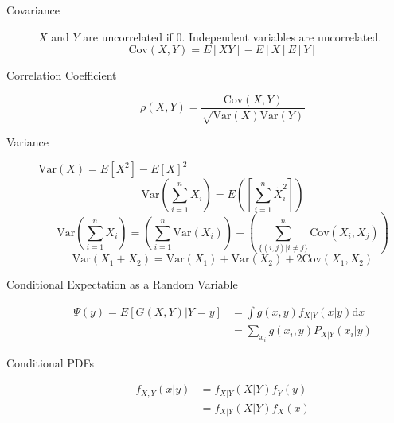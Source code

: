 \documentclass[8pt]{article}
\newcommand{\dd}[1]{\mathrm{d}{#1}}
\begin{document}

\begin{multicols}{2}
  \begin{description}
  \item[Covariance] $X$ and $Y$ are uncorrelated if 0. Independent
    variables are uncorrelated.
    $$\text{Cov}(X,Y)=E[XY]-E[X]E[Y]$$
  \item[Correlation Coefficient]
    $$\rho(X,Y)=\frac{\text{Cov}(X,Y)}{\sqrt{\text{Var}(X)\text{Var}(Y)}}$$
  \item[Variance] $\text{Var}(X) = E[X^2] - E[X]^2$
    $$\text{Var}\left(\sum_{i=1}^{n}X_i\right) =
    E\left(\left[\sum_{i=1}^{n}\tilde{X}_i^2\right]\right)$$
    $$\text{Var}\left(\sum_{i=1}^{n}X_i\right) =
    \left(\sum_{i=1}^{n}\text{Var}(X_i)\right) + \left(\sum_{\{(i,j) |
        i\not= j\}}^{n}\text{Cov}(X_i, X_j)\right)$$
    $$\text{Var}(X_1 + X_2) = \text{Var}(X_1) + \text{Var}(X_2) +
    2\text{Cov}(X_1,X_2)$$
  \item[Conditional Expectation as a Random Variable] 
    \begin{equation*}
      \begin{aligned}
        \Psi(y) = E[G(X,Y)|Y=y] &= \int g(x,y) f_{X|Y}(x|y) \dd{x} \\
        &= \sum_{x_i} g(x_i,y) P_{X|Y}(x_i|y)
      \end{aligned}
    \end{equation*}
  \item[Conditional PDFs]
    \begin{equation*}
      \begin{aligned}
        f_{X,Y}(x|y) &= f_{X|Y}(X|Y)f_Y(y) \\
        &= f_{X|Y}(X|Y)f_X(x) \\
      \end{aligned}
    \end{equation*}
  \end{description}
\end{multicols}
\end{document}

